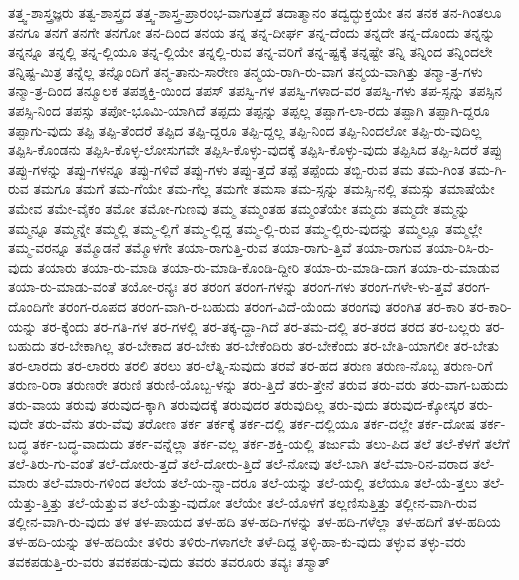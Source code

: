 {ತತ್ತ್ವ-ಶಾಸ್ತ್ರಜ್ಞರು
ತತ್ವ-ಶಾಸ್ತ್ರದ
ತತ್ತ್ವ-ಶಾಸ್ತ್ರ-ಪ್ರಾರಂಭ-ವಾಗುತ್ತದೆ
ತದಾತ್ಮಾನಂ
ತದ್ವದ್ಭುಕ್ತಯೇ
ತನ
ತನಕ
ತನ-ಗಿಂತಲೂ
ತನಗೂ
ತನಗೆ
ತನಗೇ
ತನಗೋ
ತನ-ದಿಂದ
ತನಯ
ತನ್ನ
ತನ್ನ-ದೀರ್ಘ
ತನ್ನ-ದೆಂದು
ತನ್ನದೇ
ತನ್ನ-ದೊಂದು
ತನ್ನನ್ನು
ತನ್ನನ್ನೂ
ತನ್ನಲ್ಲಿ
ತನ್ನ-ಲ್ಲಿಯೂ
ತನ್ನ-ಲ್ಲಿಯೇ
ತನ್ನಲ್ಲಿ-ರುವ
ತನ್ನ-ವರಿಗೆ
ತನ್ನ-ಷ್ಟಕ್ಕೆ
ತನ್ನಷ್ಟೇ
ತನ್ನಿ
ತನ್ನಿಂದ
ತನ್ನಿಂದಲೇ
ತನ್ನಿಷ್ಟ-ಮಿತ್ರ
ತನ್ನೆಲ್ಲ
ತನ್ನೊಂದಿಗೆ
ತನ್ಮ-ತಾನು-ಸಾರೇಣ
ತನ್ಮಯ-ರಾಗಿ-ರು-ವಾಗ
ತನ್ಮಯ-ವಾಗಿತ್ತು
ತನ್ಮಾ-ತ್ರ-ಗಳು
ತನ್ಮಾ-ತ್ರ-ದಿಂದ
ತನ್ಮೂಲಕ
ತಪಶ್ಶಕ್ತಿ-ಯಿಂದ
ತಪಸ್
ತಪಸ್ವಿ-ಗಳ
ತಪಸ್ವಿ-ಗಳಾದ-ವರ
ತಪಸ್ವಿ-ಗಳು
ತಪ-ಸ್ಸನ್ನು
ತಪಸ್ಸಿನ
ತಪಸ್ಸಿ-ನಿಂದ
ತಪಸ್ಸು
ತಪೋ-ಭೂಮಿ-ಯಾಗಿದೆ
ತಪ್ಪದು
ತಪ್ಪನ್ನು
ತಪ್ಪಲ್ಲ
ತಪ್ಪಾಗ-ಲಾ-ರದು
ತಪ್ಪಾಗಿ
ತಪ್ಪಾಗಿ-ದ್ದರೂ
ತಪ್ಪಾಗು-ವುದು
ತಪ್ಪಿ
ತಪ್ಪಿ-ತೆಂದರೆ
ತಪ್ಪಿದ
ತಪ್ಪಿ-ದ್ದರೂ
ತಪ್ಪಿ-ದ್ದಲ್ಲ
ತಪ್ಪಿ-ನಿಂದ
ತಪ್ಪಿ-ನಿಂದಲೋ
ತಪ್ಪಿ-ರು-ವುದಿಲ್ಲ
ತಪ್ಪಿಸಿ-ಕೊಂಡನು
ತಪ್ಪಿಸಿ-ಕೊಳ್ಳ-ಲೋಸುಗವೇ
ತಪ್ಪಿಸಿ-ಕೊಳ್ಳು-ವುದಕ್ಕೆ
ತಪ್ಪಿಸಿ-ಕೊಳ್ಳು-ವುದು
ತಪ್ಪಿಸಿದ
ತಪ್ಪಿ-ಸಿದರೆ
ತಪ್ಪು
ತಪ್ಪು-ಗಳನ್ನು
ತಪ್ಪು-ಗಳನ್ನೂ
ತಪ್ಪು-ಗಳಿವೆ
ತಪ್ಪು-ಗಳು
ತಪ್ಪು-ತ್ತದೆ
ತಪ್ಪೆ
ತಪ್ಪೆಂದು
ತಬ್ಬಿ-ರುವ
ತಮ
ತಮ-ಗಿಂತ
ತಮ-ಗಿ-ರುವ
ತಮಗೂ
ತಮಗೆ
ತಮ-ಗೆಯೇ
ತಮ-ಗೆಲ್ಲ
ತಮಗೇ
ತಮಸಾ
ತಮ-ಸ್ಸನ್ನು
ತಮಸ್ಸಿ-ನಲ್ಲಿ
ತಮಸ್ಸು
ತಮಾಷೆಯೇ
ತಮೇವ
ತಮೇ-ವೈಕಂ
ತಮೋ
ತಮೋ-ಗುಣವು
ತಮ್ಮ
ತಮ್ಮಂತಹ
ತಮ್ಮಂತೆಯೇ
ತಮ್ಮದು
ತಮ್ಮದೇ
ತಮ್ಮನ್ನು
ತಮ್ಮನ್ನೂ
ತಮ್ಮನ್ನೇ
ತಮ್ಮಲ್ಲಿ
ತಮ್ಮ-ಲ್ಲಿಗೆ
ತಮ್ಮ-ಲ್ಲಿದ್ದ
ತಮ್ಮ-ಲ್ಲಿ-ರುವ
ತಮ್ಮ-ಲ್ಲಿರು-ವುದನ್ನು
ತಮ್ಮಲ್ಲೂ
ತಮ್ಮಲ್ಲೇ
ತಮ್ಮ-ವರನ್ನೂ
ತಮ್ಮೊಡನೆ
ತಮ್ಮೊಳಗೇ
ತಯಾ-ರಾಗುತ್ತಿ-ರುವ
ತಯಾ-ರಾಗು-ತ್ತಿವೆ
ತಯಾ-ರಾಗುವ
ತಯಾ-ರಿಸಿ-ರು-ವುದು
ತಯಾರು
ತಯಾ-ರು-ಮಾಡಿ
ತಯಾ-ರು-ಮಾಡಿ-ಕೊಂಡಿ-ದ್ದೀರಿ
ತಯಾ-ರು-ಮಾಡಿ-ದಾಗ
ತಯಾ-ರು-ಮಾಡುವ
ತಯಾ-ರು-ಮಾಡು-ವಂತೆ
ತಯೋ-ರನ್ಯಃ
ತರ
ತರಂಗ
ತರಂಗ-ಗಳನ್ನು
ತರಂಗ-ಗಳು
ತರಂಗ-ಗಳೇ-ಳು-ತ್ತವೆ
ತರಂಗ-ದೊಂದಿಗೇ
ತರಂಗ-ರೂಪದ
ತರಂಗ-ವಾಗಿ-ರ-ಬಹುದು
ತರಂಗ-ವಿದೆ-ಯೆಂದು
ತರಂಗವು
ತರಂಗಿತ
ತರ-ಕಾರಿ
ತರ-ಕಾರಿ-ಯನ್ನು
ತರ-ಕ್ಕೆಂದು
ತರ-ಗತಿ-ಗಳ
ತರ-ಗಳಲ್ಲಿ
ತರ-ತಕ್ಕ-ದ್ದಾ-ಗಿದೆ
ತರ-ತಮ-ದಲ್ಲಿ
ತರ-ತರದ
ತರದ
ತರ-ಬಲ್ಲರು
ತರ-ಬಹುದು
ತರ-ಬೇಕಾಗಿಲ್ಲ
ತರ-ಬೇಕಾದ
ತರ-ಬೇಕು
ತರ-ಬೇಕೆಂದಿರು
ತರ-ಬೇಕೆಂದು
ತರ-ಬೇತಿ-ಯಾಗಲೀ
ತರ-ಬೇತು
ತರ-ಲಾರದು
ತರ-ಲಾರರು
ತರಲಿ
ತರಲು
ತರ-ಲೆತ್ನಿ-ಸುವುದು
ತರವೆ
ತರ-ಹದ
ತರುಣ
ತರುಣ-ನೊಬ್ಬ
ತರುಣ-ರಿಗೆ
ತರುಣ-ರಿರಾ
ತರುಣರೇ
ತರುಣಿ
ತರುಣಿ-ಯೊಬ್ಬ-ಳನ್ನು
ತರು-ತ್ತಿದೆ
ತರು-ತ್ತೇನೆ
ತರುವ
ತರು-ವರು
ತರು-ವಾಗ-ಬಹುದು
ತರು-ವಾಯ
ತರುವು
ತರುವುದ-ಕ್ಕಾಗಿ
ತರುವುದಕ್ಕೆ
ತರುವುದರ
ತರುವುದಿಲ್ಲ
ತರು-ವುದು
ತರುವುದ-ಕ್ಕೋಸ್ಕರ
ತರು-ವುದೇ
ತರು-ವೆನು
ತರು-ವೆವು
ತರೋಣ
ತರ್ಕ
ತರ್ಕಕ್ಕೆ
ತರ್ಕ-ದಲ್ಲಿ
ತರ್ಕ-ದಲ್ಲಿಯೂ
ತರ್ಕ-ದಲ್ಲೇ
ತರ್ಕ-ದೋಷ
ತರ್ಕ-ಬದ್ಧ
ತರ್ಕ-ಬದ್ಧ-ವಾದುದು
ತರ್ಕ-ವನ್ನೆಲ್ಲಾ
ತರ್ಕ-ವಲ್ಲ
ತರ್ಕ-ಶಕ್ತಿ-ಯಲ್ಲಿ
ತರ್ಜುಮೆ
ತಲು-ಪಿದ
ತಲೆ
ತಲೆ-ಕೆಳಗೆ
ತಲೆಗೆ
ತಲೆ-ತಿರು-ಗು-ವಂತೆ
ತಲೆ-ದೋರು-ತ್ತದೆ
ತಲೆ-ದೋರು-ತ್ತಿದೆ
ತಲೆ-ನೋವು
ತಲೆ-ಬಾಗಿ
ತಲೆ-ಮಾ-ರಿನ-ವರಾದ
ತಲೆ-ಮಾರು
ತಲೆ-ಮಾರು-ಗಳಿಂದ
ತಲೆಯ
ತಲೆ-ಯ-ನ್ನಾ-ದರೂ
ತಲೆ-ಯನ್ನು
ತಲೆ-ಯಲ್ಲಿ
ತಲೆಯೂ
ತಲೆ-ಯೆ-ತ್ತಲು
ತಲೆ-ಯೆತ್ತು-ತ್ತಿತ್ತು
ತಲೆ-ಯೆತ್ತುವ
ತಲೆ-ಯೆತ್ತು-ವುದೋ
ತಲೆಯೇ
ತಲೆ-ಯೊಳಗೆ
ತಲ್ಲಣಿಸುತ್ತಿತ್ತು
ತಲ್ಲೀನ-ವಾಗಿ-ರುವ
ತಲ್ಲೀನ-ವಾಗಿ-ರು-ವುದು
ತಳ
ತಳ-ಪಾಯದ
ತಳ-ಹದಿ
ತಳ-ಹದಿ-ಗಳನ್ನು
ತಳ-ಹದಿ-ಗಳೆಲ್ಲಾ
ತಳ-ಹದಿಗೆ
ತಳ-ಹದಿಯ
ತಳ-ಹದಿ-ಯನ್ನು
ತಳ-ಹದಿಯೇ
ತಳಿರು
ತಳಿರು-ಗಳಾಗಲೇ
ತಳೆ-ದಿದ್ದ
ತಳ್ಳಿ-ಹಾ-ಕು-ವುದು
ತಳ್ಳುವ
ತಳ್ಳು-ವರು
ತವಕಪಡುತ್ತಿ-ರು-ವರು
ತವಕಪಡು-ವುದು
ತವರು
ತವರೂರು
ತವ್ಯಃ
ತಸ್ಮಾತ್
}
